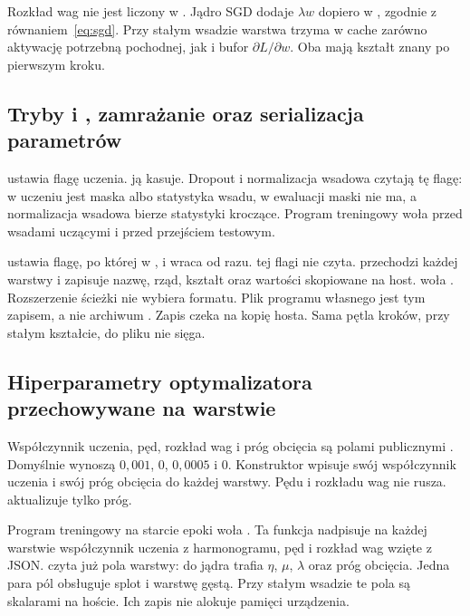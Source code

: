 Rozkład wag nie jest liczony w . Jądro SGD dodaje \(\lambda w\) dopiero w , zgodnie z równaniem~\eqref{eq:sgd}. Przy stałym wsadzie warstwa trzyma w cache zarówno aktywację potrzebną pochodnej, jak i bufor \(\partial L / \partial w\). Oba mają kształt znany po pierwszym kroku.

\subsection{Tryby  i , zamrażanie oraz serializacja parametrów}

 ustawia flagę uczenia.  ją kasuje. Dropout i normalizacja wsadowa czytają tę flagę: w uczeniu jest maska albo statystyka wsadu, w ewaluacji maski nie ma, a normalizacja wsadowa bierze statystyki kroczące. Program treningowy woła  przed wsadami uczącymi i  przed przejściem testowym.

 ustawia flagę, po której  w ,  i  wraca od razu.  tej flagi nie czyta.  przechodzi  każdej warstwy i zapisuje nazwę, rząd, kształt oraz wartości  skopiowane na host.  woła . Rozszerzenie ścieżki nie wybiera formatu. Plik  programu własnego jest tym zapisem, a nie archiwum . Zapis czeka na kopię hosta. Sama pętla kroków, przy stałym kształcie, do pliku nie sięga.

\subsection{Hiperparametry optymalizatora przechowywane na warstwie}

Współczynnik uczenia, pęd, rozkład wag i próg obcięcia są polami publicznymi . Domyślnie wynoszą \(0{,}001\), \(0\), \(0{,}0005\) i \(0\). Konstruktor  wpisuje swój współczynnik uczenia i swój próg obcięcia do każdej warstwy. Pędu i rozkładu wag nie rusza.  aktualizuje tylko próg.

Program treningowy na starcie epoki woła . Ta funkcja nadpisuje na każdej warstwie współczynnik uczenia z harmonogramu, pęd i rozkład wag wzięte z JSON.  czyta już pola warstwy: do jądra trafia \(\eta\), \(\mu\), \(\lambda\) oraz próg obcięcia. Jedna para pól obsługuje splot i warstwę gęstą. Przy stałym wsadzie te pola są skalarami na hoście. Ich zapis nie alokuje pamięci urządzenia.

